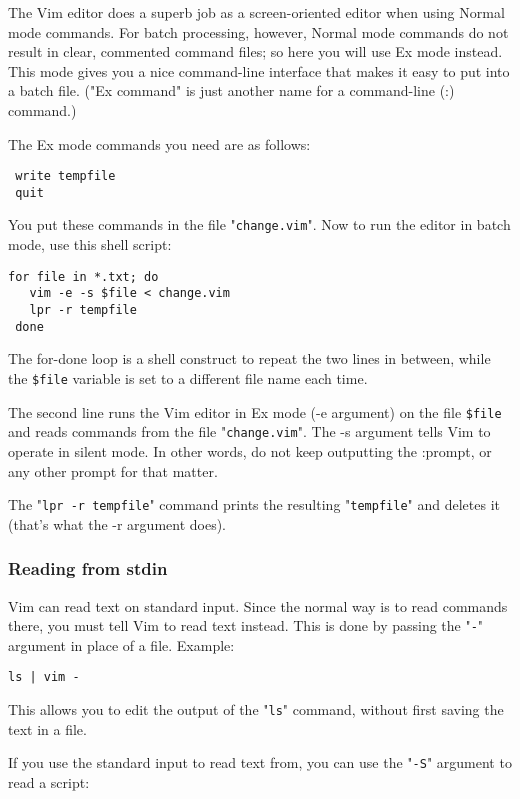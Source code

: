 The Vim editor does a superb job as a screen-oriented editor when using Normal mode commands.
For batch processing, however, Normal mode commands do not result in clear, commented command files; so here you will use Ex mode instead.
This mode gives you a nice command-line interface that makes it easy to put into a batch file.
("Ex command" is just another name for a command-line (:) command.)

The Ex mode commands you need are as follows:

\begin{Verbatim}[samepage=true]
 %s/-person-/Jones/g
 write tempfile
 quit
\end{Verbatim}

You put these commands in the file "\verb!change.vim!".
Now to run the editor in batch mode, use this shell script:

\begin{Verbatim}[samepage=true]
 for file in *.txt; do
   vim -e -s $file < change.vim
   lpr -r tempfile
 done
\end{Verbatim}

The for-done loop is a shell construct to repeat the two lines in between, while the \verb!$file! variable is set to a different file name each time.

The second line runs the Vim editor in Ex mode (-e argument) on the file \verb!$file! and reads commands from the file "\verb!change.vim!".
The -s argument tells Vim to operate in silent mode.
In other words, do not keep outputting the :prompt, or any other prompt for that matter.

The "\verb!lpr -r tempfile!" command prints the resulting "\verb!tempfile!" and deletes it (that's what the -r argument does).
\subsubsection{Reading from stdin}
Vim can read text on standard input.
Since the normal way is to read commands there, you must tell Vim to read text instead.
This is done by passing the "\verb!-!" argument in place of a file.
Example:

\begin{Verbatim}[samepage=true]
 ls | vim -
\end{Verbatim}

This allows you to edit the output of the "\verb!ls!" command, without first saving the text in a file.

If you use the standard input to read text from, you can use the "\verb!-S!" argument to read a script:


